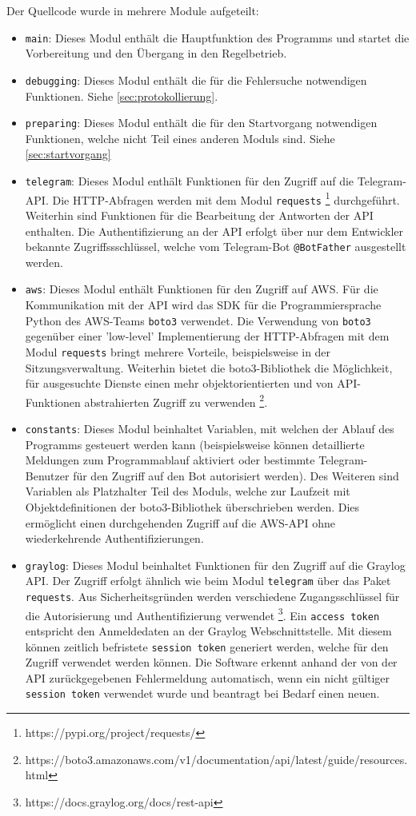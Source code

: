 Der Quellcode wurde in mehrere Module aufgeteilt:

\begin{itemize}
\item \lstinline{main}: Dieses Modul enthält die Hauptfunktion des Programms und startet die Vorbereitung und den Übergang in den Regelbetrieb.
\item \lstinline{debugging}: Dieses Modul enthält die für die Fehlersuche notwendigen Funktionen. Siehe \autoref{sec:protokollierung}.
\item \lstinline{preparing}: Dieses Modul enthält die für den Startvorgang notwendigen Funktionen, welche nicht Teil eines anderen Moduls sind. Siehe \autoref{sec:startvorgang}
\item \lstinline{telegram}: Dieses Modul enthält Funktionen für den Zugriff auf die Telegram-API. Die HTTP-Abfragen werden mit dem Modul \lstinline{requests} \footnote{https://pypi.org/project/requests/} durchgeführt. Weiterhin sind Funktionen für die Bearbeitung der Antworten der API enthalten. Die Authentifizierung an der API erfolgt über nur dem Entwickler bekannte Zugriffssschlüssel, welche vom Telegram-Bot \lstinline{@BotFather} ausgestellt werden.
\item \lstinline{aws}: Dieses Modul enthält Funktionen für den Zugriff auf AWS. Für die Kommunikation mit der API wird das SDK für die Programmiersprache Python des AWS-Teams \lstinline{boto3} verwendet. Die Verwendung von \lstinline{boto3} gegenüber einer 'low-level' Implementierung der HTTP-Abfragen mit dem Modul \lstinline{requests} bringt mehrere Vorteile, beispielsweise in der Sitzungsverwaltung. Weiterhin bietet die boto3-Bibliothek die Möglichkeit, für ausgesuchte Dienste einen mehr objektorientierten und von API-Funktionen abstrahierten Zugriff zu verwenden \footnote{https://boto3.amazonaws.com/v1/documentation/api/latest/guide/resources.html}.
\item \lstinline{constants}: Dieses Modul beinhaltet Variablen, mit welchen der Ablauf des Programms gesteuert werden kann (beispielsweise können detaillierte Meldungen zum Programmablauf aktiviert oder bestimmte Telegram-Benutzer für den Zugriff auf den Bot autorisiert werden). Des Weiteren sind Variablen als Platzhalter Teil des Moduls, welche zur Laufzeit mit Objektdefinitionen der boto3-Bibliothek überschrieben werden. Dies ermöglicht einen durchgehenden Zugriff auf die AWS-API ohne wiederkehrende Authentifizierungen.
\item \lstinline{graylog}: Dieses Modul beinhaltet Funktionen für den Zugriff auf die Graylog API. Der Zugriff erfolgt ähnlich wie beim Modul \lstinline{telegram} über das Paket \lstinline{requests}. Aus Sicherheitsgründen werden verschiedene Zugangsschlüssel für die Autorisierung und Authentifizierung verwendet \footnote{https://docs.graylog.org/docs/rest-api}. Ein \lstinline{access token} entspricht den Anmeldedaten an der Graylog Webschnittstelle. Mit diesem können zeitlich befristete \lstinline{session token} generiert werden, welche für den Zugriff verwendet werden können. Die Software erkennt anhand der von der API zurückgegebenen Fehlermeldung automatisch, wenn ein nicht gültiger \lstinline{session token} verwendet wurde und beantragt bei Bedarf einen neuen.

\end{itemize}
